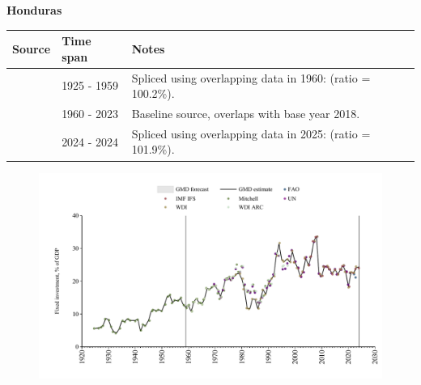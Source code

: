 \documentclass[12pt,a4paper,landscape]{article}
\begin{document}
\begin{adjustbox}{max totalsize={\paperwidth}{\paperheight},center}
\begin{minipage}[t][\textheight][t]{\textwidth}
\vspace*{0.5cm}
{}
\begin{center}
{\Large\bfseries Honduras}
\end{center}
\vspace{0.5cm}
\begin{table}[H]
\centering
\small
\begin{tabular}{|l|l|l|}
\hline
\textbf{Source} & \textbf{Time span} & \textbf{Notes} \\
\hline
\rowcolor{white}\cite{Mitchell}& 1925 - 1959 &Spliced using overlapping data in 1960: (ratio = 100.2\%).\\
\rowcolor{lightgray}\cite{WDI}& 1960 - 2023 &Baseline source, overlaps with base year 2018.\\
\rowcolor{white}\cite{IMF_IFS}& 2024 - 2024 &Spliced using overlapping data in 2025: (ratio = 101.9\%).\\
\hline
\end{tabular}
\end{table}
\begin{figure}[H]
\centering
\includegraphics[width=\textwidth,height=0.6\textheight,keepaspectratio]{graphs/HND_finv_GDP.pdf}
\end{figure}
\end{minipage}
\end{adjustbox}
\end{document}

